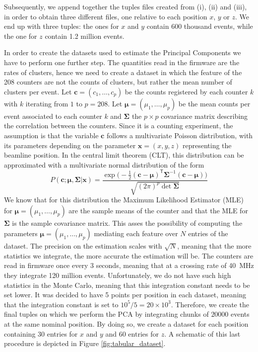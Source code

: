 Subsequently, we append together the tuples files created from (i), (ii) and (iii), in order to obtain three different files, one relative to each position $x$, $y$ or $z$. We end up with three tuples: the ones for $x$ and $y$ contain 600 thousand events, while the one for $z$ contain 1.2 million events. 

In order to create the datasets used to estimate the Principal Components we have to perform one further step.
The quantities read in the firmware are the rates of clusters, hence we need to create a dataset in which the feature of the 208 counters are not the counts of clusters, but rather the mean number of clusters per event. 
Let $\mathbf{c}=(c_1, \dots, c_p)$ be the counts registered by each counter $k$ with $k$ iterating from $1$ to $p=208$. Let $\mathbf{\mu}=(\mu_1, \dots, \mu_p)$ be the mean counts per event associated to each counter $k$ and $\mathbf{\Sigma}$ the $p\times p$ covariance matrix describing the correlation between the counters. Since it is a counting experiment, the assumption is that the variable $\mathbf{c}$ follows a multivariate Poisson distribution, with its parameters depending on the parameter $\mathbf{x}=(x,y,z)$ representing the beamline position. In the central limit theorem (CLT), this distribution can be approximated with a multivariate normal distribution of the form 
\begin{equation}
    P(\mathbf{c} ; \mathbf{\mu},\mathbf{\Sigma} |\mathbf{x}) = \frac{\exp \bigl(-\frac{1}{2}(\mathbf{c}-\mathbf{\mu})^{\mathsf{T}}\mathbf{\Sigma}^{-1}(\mathbf{c}-\mathbf{\mu})\bigr)}{\sqrt{(2\pi)^p\det\mathbf{\Sigma}}}\label{mvgaussian}
\end{equation} 
We know that for this distribution the Maximum Likelihood Estimator (MLE) for  $\mathbf{\mu}=(\mu_1, \dots, \mu_p)$ are the sample means of the counter and that the MLE for $\mathbf{\Sigma}$ is the sample covariance matrix.
This asses the possibility of computing the parameters  $\mathbf{\mu}=(\mu_1, \dots, \mu_p)$ mediating each feature over $N$ entries of the dataset. The precision on the estimation scales with $\sqrt{N}$, meaning that the more statistics we integrate, the more accurate the estimation will be. 
The counters are read in firmware once every $3$ seconds, meaning that at a crossing rate of \SI{40}{\mega\hertz} they integrate 120 million events. Unfortunately, we do not have such high statistics in the Monte Carlo, meaning that this integration constant needs to be set lower. It was decided to have 5 points per position in each dataset, meaning that the integration constant is set to $10^5/5=20\times10^3$. Therefore, we create the final tuples on which we perform the PCA by integrating chunks of $20000$ events at the same nominal position. By doing so, we create a dataset for each position containing 30 entries for $x$ and $y$ and 60 entries for $z$. A schematic of this last procedure is depicted in Figure \ref{fig:tabular_dataset}. 

